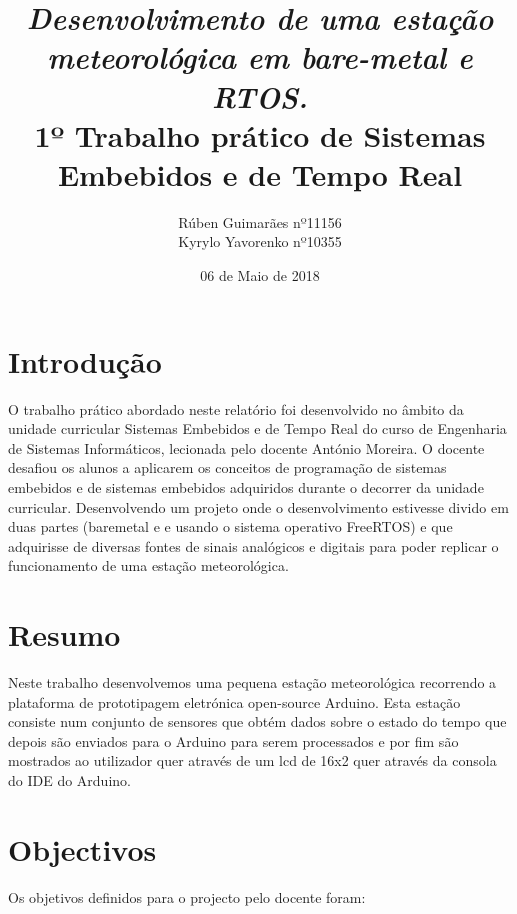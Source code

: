 \documentclass[11pt]{report}
\title{\textbf{\textit{Desenvolvimento de uma estação meteorológica em bare-metal e RTOS. }\\
		\large1º Trabalho prático de
		Sistemas Embebidos e de Tempo Real }}
\author{Rúben Guimarães nº11156\\ Kyrylo Yavorenko nº10355 }
\affil{Escola Superior de Tecnologia, IPCA \\
	Barcelos}
\date{06 de Maio de 2018}
\begin{document}
\maketitle




\tableofcontents


\chapter*{Introdução}


O trabalho prático abordado neste relatório foi desenvolvido no âmbito da unidade curricular Sistemas Embebidos e de Tempo Real do curso de Engenharia de Sistemas Informáticos, lecionada pelo docente António Moreira. O docente desafiou os alunos a aplicarem os conceitos de programação de sistemas embebidos e de sistemas embebidos adquiridos durante o decorrer da unidade curricular. Desenvolvendo um projeto onde o desenvolvimento estivesse divido em duas partes (baremetal e e usando o sistema operativo FreeRTOS) e que adquirisse de diversas fontes de sinais analógicos e digitais para poder replicar o funcionamento de uma estação meteorológica.


\clearpage



\chapter*{Resumo}

Neste trabalho desenvolvemos uma pequena estação meteorológica recorrendo a plataforma de prototipagem eletrónica open-source Arduino. Esta estação consiste num conjunto de sensores que obtém dados sobre o estado do tempo que depois são enviados para o Arduino para serem processados e por fim são mostrados ao utilizador quer através de um lcd de 16x2 quer através da consola do IDE do Arduino.


\clearpage


\chapter*{Objectivos}

Os objetivos definidos para o projecto pelo docente foram:
\end{document}
